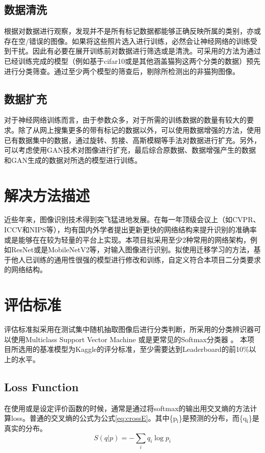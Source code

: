 \documentclass[a4paper,11pt]{article}
\begin{document}
\subsection{数据清洗}
\label{sec:org228f37f}
根据对数据进行观察，发现并不是所有标记数据都能够正确反映所属的类别，亦或存在空/错误的图像。如果将这些照片选入进行训练，必然会让神经网络的训练受到干扰。因此有必要在展开训练前对数据进行筛选或是清洗。可采用的方法为通过已经训练完成的模型（例如基于cifar10或是其他涵盖猫狗这两个分类的数据）预先进行分类筛查。通过至少两个模型的筛查后，剔除所检测出的非猫狗图像。

\subsection{数据扩充}
\label{sec:org1f15911}
对于神经网络训练而言，由于参数众多，对于所需的训练数据的数量有较大的要求。除了从网上搜集更多的带有标记的数据以外，可以使用数据增强的方法，使用已有数据集中的数据，通过旋转、剪接、高斯模糊等手法对数据进行扩充。另外，可以考虑使用GAN技术对图像进行扩充，最后综合原数据、数据增强产生的数据和GAN生成的数据对所选的模型进行训练。

\section{解决方法描述}
\label{sec:org4b1bf69}
近些年来，图像识别技术得到突飞猛进地发展。在每一年顶级会议上（如CVPR、ICCV和NIPS等），均有国内外学者提出更新更快的网络结构来提升识别的准确率或是能够在在较为轻量的平台上实现。本项目拟采用至少2种常用的网络架构，例如ResNet或是MobileNetV2等，对输入图像进行识别。拟使用迁移学习的方法，基于他人已训练的通用性很强的模型进行修改和训练，自定义符合本项目二分类要求的网络结构。


\section{评估标准}
\label{sec:orga031eb5}
评估标准拟采用在测试集中随机抽取图像后进行分类判断，所采用的分类辨识器可以使用Multiclass Support Vector Machine \cite{Kung2014} 或是更常见的Softmax分类器 \cite{QiWangLiu2017}。 本项目所选用的基准模型为Kaggle的评分标准，至少需要达到Leaderboard的前10\%以上的水平。

\subsection{Loss Function}
\label{sec:org782b769}
在使用或是设定评价函数的时候，通常是通过将softmax的输出用交叉熵的方法计算loss。普通的交叉熵的公式为公式\ref{eq:crossE}。其中\{p\(_{\text{i}}\)\}是预测的分布，而\{q\(_{\text{i}}\)\}是真实的分布。
\begin{equation}
\label{eq:crossE}
S(q|p) = -\sum_i q_i \log{p_i}
\end{equation}
\end{document}
